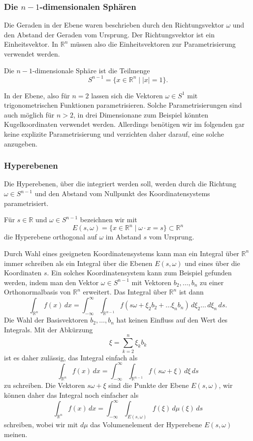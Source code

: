 %
%
\subsubsection{Die $n-1$-dimensionalen Sphären}
Die Geraden in der Ebene waren beschrieben durch den Richtungsvektor
$\omega$ und den Abstand der Geraden vom Ursprung.
Der Richtungsvektor ist ein Einheitsvektor.
In $\mathbb{R}^n$ müssen also die Einheitsvektoren zur Parametrisierung
verwendet werden.

\begin{definition}
Die $n-1$-dimensionale Sphäre ist die Teilmenge
\[
S^{n-1}
=
\{
x\in\mathbb{R}^n
\mid
|x|=1
\}.
\]
\end{definition}

In der Ebene, also für $n=2$ lassen sich die Vektoren $\omega\in S^1$
mit trigonometrischen Funktionen parametrisieren.
Solche Parametrisierungen sind auch möglich für $n>2$, in drei
Dimensionane zum Beispiel könnten Kugelkoordinaten verwendet werden.
Allerdings benötigen wir im folgenden gar keine explizite Parametrisierung
und verzichten daher darauf, eine solche anzugeben.

%
%
\subsubsection{Hyperebenen}
Die Hyperebenen, über die integriert werden soll, werden durch die
Richtung $\omega\in S^{n-1}$ und den Abstand vom Nullpunkt des
Koordinatensystems parametrisiert.

\begin{definition}
Für $s\in\mathbb{R}$ und $\omega\in S^{n-1}$ bezeichnen wir mit
\[
E(s,\omega)
=
\{
x\in\mathbb{R}^n
\mid
\omega\cdot x = s
\}
\subset
\mathbb{R}^n
\]
die Hyperebene orthogonal auf $\omega$ im Abstand $s$ vom Ursprung.
\end{definition}

Durch Wahl eines geeigneten Koordinatensystems kann man ein
Integral über $\mathbb{R}^n$ immer schreiben als
ein Integral über die Ebenen $E(s,\omega)$ und eines über die Koordinaten $s$.
Ein solches Koordinatensystem kann zum Beispiel gefunden werden, indem
man den Vektor $\omega\in S^{n-1}$ mit Vektoren $b_2,\dots,b_n$ zu einer
Orthonormalbasis von $\mathbb{R}^n$ erweitert.
Das Integral über $\mathbb{R}^n$ ist dann
\[
\int_{\mathbb{R}^n} f(x)\,dx
=
\int_{-\infty}^\infty
\int_{\mathbb{R}^{n-1}}
f(s\omega + \xi_2 b_2+\dots \xi_n b_n)
\,d\xi_2\dots\,d\xi_n
\,ds.
\]
Die Wahl der Basisvektoren $b_2,\dots,b_n$ hat keinen Einfluss
auf den Wert des Integrals.
Mit der Abkürzung
\[
\xi
=
\sum_{k=2}^n
\xi_k b_k
\]
ist es daher zulässig, das Integral einfach als
\[
\int_{\mathbb{R}^n} f(x)\,dx
=
\int_{-\infty}^\infty
\int_{\mathbb{R}^{n-1}}
f(s\omega + \xi)
\,d\xi
\,ds
\]
zu schreiben.
Die Vektoren $s\omega +\xi$ sind die Punkte der Ebene $E(s,\omega)$,
wir können daher das Integral noch einfacher als
\[
\int_{\mathbb{R}^n} f(x)\,dx
=
\int_{-\infty}^\infty
\int_{E(s,\omega)}
f(\xi)
\,d\mu(\xi)
\,ds
\]
schreiben, wobei wir mit $d\mu$ das Volumenelement der Hyperebene
$E(s,\omega)$ meinen.

